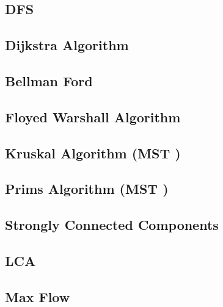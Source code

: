 \documentclass[10pt, a4paper]{article}
\begin{document}
\begin{multicols}{2}
\subsection{DFS}


\subsection{Dijkstra Algorithm}


\subsection{Bellman Ford}


\subsection{Floyed Warshall Algorithm}


\subsection{Kruskal Algorithm (MST \allowbreak)}


\subsection{Prims Algorithm (MST \allowbreak)}


\subsection{Strongly Connected Components}


\subsection{LCA}


\subsection{Max Flow}



\end{multicols}
\end{document}
